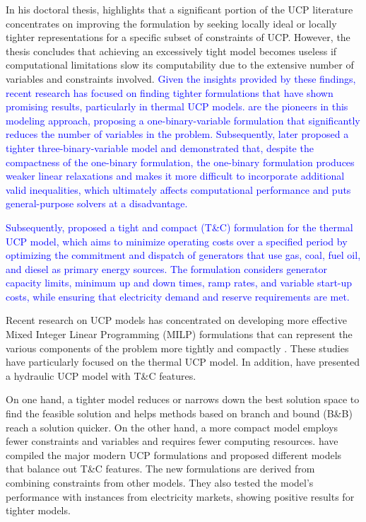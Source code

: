 In his doctoral thesis, \citet{Morales-Espania2014_thesis} highlights that a significant portion of the UCP literature concentrates on improving the formulation by seeking locally ideal or locally tighter representations for a specific subset of constraints of UCP.  However, the thesis concludes that achieving an excessively tight model becomes useless if computational limitations slow its computability due to the extensive number of variables and constraints involved. \textcolor{blue}{Given the insights provided by these findings, recent research has focused on finding tighter formulations that have shown promising results, particularly in thermal UCP models.  \citet{CarrionArroyo2006} are the pioneers in this modeling approach, proposing a one-binary-variable formulation that significantly reduces the number of variables in the problem. Subsequently, \citet{Ostrowski2012} later proposed a tighter three-binary-variable model and demonstrated that, despite the compactness of the one-binary formulation, the one-binary formulation produces weaker linear relaxations and makes it more difficult to incorporate additional valid inequalities, which ultimately affects computational performance and puts general-purpose solvers at a disadvantage.}

\textcolor{blue}{Subsequently, \citet{Morales-Espania2013} proposed a tight and compact (T\&C) formulation for the thermal UCP model, which aims to minimize operating costs over a specified period by optimizing the commitment and dispatch of generators that use gas, coal, fuel oil, and diesel as primary energy sources. The formulation considers generator capacity limits, minimum up and down times, ramp rates, and variable start-up costs, while ensuring that electricity demand and reserve requirements are met.}

Recent research on UCP models has concentrated on developing more effective Mixed Integer Linear Programming (MILP) formulations that can represent the various components of the problem more tightly and compactly \citep{Morales-Espania2013b,Morales-Espania2016,Yang2017,Yang2021}. These studies have particularly focused on the thermal UCP model. In addition, \citet{Guedes2017} have presented a hydraulic UCP model with T\&C features.

On one hand, a tighter model reduces or narrows down the best solution space to find the feasible solution and helps methods based on branch and bound (B\&B) reach a solution quicker. On the other hand, a more compact model employs fewer constraints and variables and requires fewer computing resources. \citet{Knueven2020b} have compiled the major modern UCP formulations and proposed different models that balance out T\&C features. The new formulations are derived from combining constraints from other models. They also tested the model's performance with instances from electricity markets, showing positive results for tighter models.

